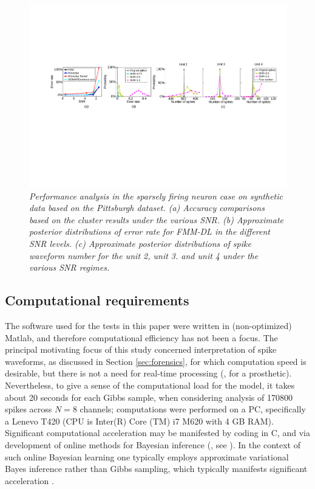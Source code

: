 \documentclass[journal]{IEEEtran}
\begin{document}
\begin{figure}[!htbp]
\centering
   \includegraphics[scale=0.70,angle=0] {figs_new/posterior_error_rate.pdf}
  \caption{\small \emph{Performance analysis in the sparsely firing neuron case on synthetic data based on the Pittsburgh dataset. (a) Accuracy comparisons based on the cluster results under the various SNR. (b) Approximate posterior distributions of error rate for FMM-DL in the different SNR levels. (c) Approximate posterior distributions of spike waveform number for the unit 2, unit 3. and unit 4 under the various SNR regimes. 
   }} \label{fig:posterior_error_rate}
\end{figure}



\subsection{Computational requirements}

The software used for the tests in this paper were written in (non-optimized) Matlab, and therefore computational efficiency has not been a focus. The principal motivating focus of this study concerned interpretation of  spike waveforms, as discussed in Section \ref{sec:forensics}, for which computation speed is desirable, but there is not a need for real-time processing (, for a prosthetic).
 Nevertheless, to give a sense of the computational load for the model, it takes about 20 seconds for each Gibbs sample, when considering analysis of 170800 spikes across $N=8$ channels; computations were performed on a PC, specifically a Lenevo T420 (CPU is Inter(R) Core (TM) i7 M620 with 4 GB RAM). Significant computational acceleration may be manifested by coding in C, and via development of online methods for Bayesian inference (, see \cite{Wang11}). In the context of such online Bayesian learning one typically employs approximate variational Bayes inference rather than Gibbs sampling, which typically manifests significant acceleration \cite{Wang11}.
\end{document}
